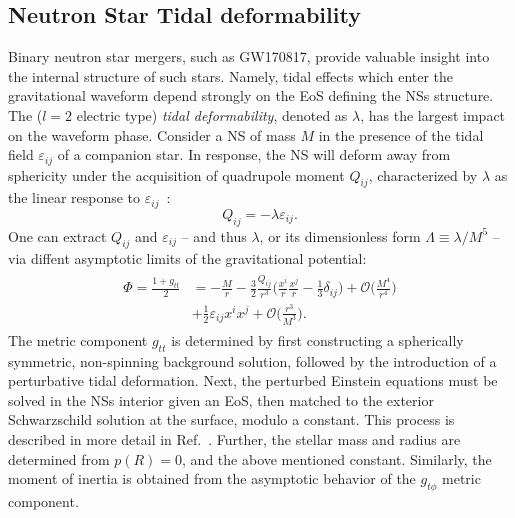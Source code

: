 \documentclass[prd,twocolumn,nofootinbib,superscriptaddress,amsmath,amssymb]{revtex4-1}
\begin{document}
\subsection{Neutron Star Tidal deformability}\label{tidal}
Binary neutron star mergers, such as GW170817, provide valuable insight into the internal structure of such stars. 
Namely, tidal effects which enter the gravitational waveform depend strongly on the EoS defining the NSs structure. 
The ($l=2$ electric type) \emph{tidal deformability}, denoted as $\lambda$, has the largest impact on the waveform phase. 
Consider a NS of mass $M$ in the presence of the tidal field $\varepsilon_{ij}$ of a companion star.
In response, the NS will deform away from sphericity under the acquisition of quadrupole moment $Q_{ij}$, characterized by $\lambda$ as the linear response to $\varepsilon_{ij}$~\cite{Flanagan2008,hinderer-love,Yagi2013}:
\begin{equation}
Q_{ij}=-\lambda \varepsilon_{ij}.
\end{equation}
One can extract $Q_{ij}$ and $\varepsilon_{ij}$ -- and thus $\lambda$, or its dimensionless form $\Lambda \equiv \lambda/M^5$ -- via diffent asymptotic limits of the gravitational potential:
\begin{align}
\begin{split}
\Phi=\frac{1+g_{tt}}{2}&=-\frac{M}{r} - \frac{3}{2}\frac{Q_{ij}}{r^3} \Bigg(\frac{x^i}{r} \frac{x^j}{r}-\frac{1}{3}\delta_{ij} \Bigg) + \mathcal{O} \Bigg( \frac{M^4}{r^4} \Bigg)\\
&+ \frac{1}{2} \varepsilon_{ij} x^i x^j + \mathcal{O} \Bigg( \frac{r^3}{M^3} \Bigg).
\end{split}
\end{align}
The metric component $g_{tt}$ is determined by first constructing a spherically symmetric, non-spinning background solution, followed by the introduction of a perturbative tidal deformation.
Next, the perturbed Einstein equations must be solved in the NSs interior given an EoS, then matched to the exterior Schwarzschild solution at the surface, modulo a constant.
This process is described in more detail in Ref.~\cite{hinderer-love}.
Further, the stellar mass and radius are determined from $p(R)=0$, and the above mentioned constant.
Similarly, the moment of inertia is obtained from the asymptotic behavior of the $g_{t \phi}$ metric component.
\end{document}
